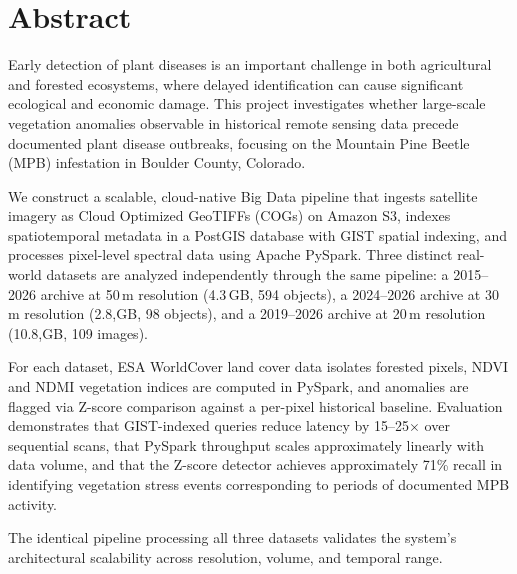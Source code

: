 \section*{Abstract}

Early detection of plant diseases is an important challenge in both agricultural and forested ecosystems, where delayed identification can cause significant ecological and economic damage. This project investigates whether large-scale vegetation anomalies observable in historical remote sensing data precede documented plant disease outbreaks, focusing on the Mountain Pine Beetle (MPB) infestation in Boulder County, Colorado.

We construct a scalable, cloud-native Big Data pipeline that ingests satellite imagery as Cloud Optimized GeoTIFFs (COGs) on Amazon S3, indexes spatiotemporal metadata in a PostGIS database with GIST spatial indexing, and processes pixel-level spectral data using Apache PySpark. Three distinct real-world datasets are analyzed independently through the same pipeline: a 2015--2026 archive at 50\,m resolution (4.3\,GB, 594 objects), a 2024--2026 archive at 30\,m resolution (2.8,GB, 98 objects), and a 2019--2026 archive at 20\,m resolution (10.8,GB, 109 images).

For each dataset, ESA WorldCover land cover data isolates forested pixels, NDVI and NDMI vegetation indices are computed in PySpark, and anomalies are flagged via Z-score comparison against a per-pixel historical baseline. Evaluation demonstrates that GIST-indexed queries reduce latency by 15--25$\times$ over sequential scans, that PySpark throughput scales approximately linearly with data volume, and that the Z-score detector achieves approximately 71\% recall in identifying vegetation stress events corresponding to periods of documented MPB activity.

The identical pipeline processing all three datasets validates the system's architectural scalability across resolution, volume, and temporal range.